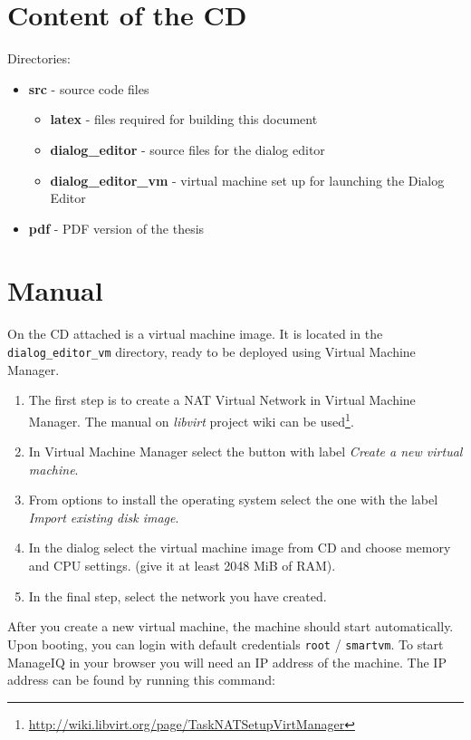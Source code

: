 \chapter{Content of the CD}
Directories:
\begin{itemize}
  \item \textbf{src} - source code files
     \begin{itemize}
        \item \textbf{latex} - files required for building this document
        \item \textbf{dialog\_editor} - source files for the dialog editor
        \item \textbf{dialog\_editor\_vm} - virtual machine set up for launching the Dialog Editor
     \end{itemize}
  \item \textbf{pdf} - PDF version of the thesis
\end{itemize}

\chapter{Manual}

On the CD attached is a virtual machine image. It is located in the
{\tt dialog\_editor\_vm} directory, ready to be deployed using Virtual Machine
Manager.

\begin{enumerate}
  \item The first step is to create a NAT Virtual Network in Virtual Machine
        Manager. The manual on {\it libvirt} project wiki can be used\footnote{\url{http://wiki.libvirt.org/page/TaskNATSetupVirtManager}}.
  \item In Virtual Machine Manager select the button with label {\it Create a new virtual machine}.
  \item From options to install the operating system select the one with the label {\it Import existing disk image}.
  \item In the dialog select the virtual machine image from CD and choose memory and CPU settings. (give it at least 2048 MiB of RAM).
  \item In the final step, select the network you have created.
\end{enumerate}

After you create a new virtual machine, the machine should start
automatically.
Upon booting, you can login with default credentials
{\tt root} / {\tt smartvm}.
To start ManageIQ in your browser you will need an IP address of the
machine. The IP address can be found by running this command:

